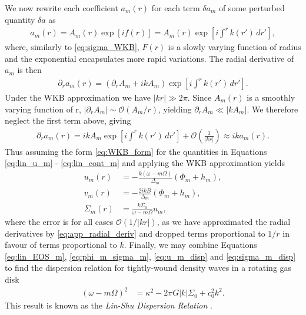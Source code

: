 We now rewrite each coefficient $a_m(r)$ for each term $\delta a_m$ of some perturbed quantity $\delta a$ as
\begin{align}
    a_m(r) = A_m(r) \exp \left[ i f(r) \right] = A_m(r) \exp \left[ i \int^r k(r') \, dr' \right], \label{eq:WKB_form}
\end{align}
where, similarly to \eqref{eq:sigma_WKB}, $F(r)$ is a slowly varying function of radius and the exponential encapsulates more rapid variations. 
The radial derivative of $a_m$ is then
\begin{align}
    \partial_r a_m(r) = \left( \partial_r A_m + ikA_m  \right) \exp \left[ i \int^r k(r') \, dr' \right].
\end{align}
Under the WKB approximation we have $|kr|\gg 2 \pi$.
Since $A_m(r)$ is a smoothly varying function of r, $|\partial_r A_m| \sim \mathcal{O}(A_m / r)$, yielding $\partial_r A_m \ll |k A_m|$.
We therefore neglect the first term above, giving
\begin{align}
    \partial_r a_m(r) = ikA_m \exp \left[ i \int^r k(r') \, dr' \right] + \mathcal{O}\left(\frac{1}{|kr|}\right) \approx ik a_m(r). \label{eq:app_radial_deriv}
\end{align}
Thus assuming the form \eqref{eq:WKB_form} for the quantities in Equations \eqref{eq:lin_u_m} - \eqref{eq:lin_cont_m} and applying the WKB approximation yields
\begin{align}
    u_m(r) &= - \frac{k(\omega-m\Omega)}{\Delta_m} (\Phi_m + h_m), \label{eq:u_m_disp} \\
    v_m(r) &= - \frac{2ikB}{\Delta_m} (\Phi_m + h_m), \label{eq:v_m_disp} \\
    \Sigma_m(r) &= \frac{k \Sigma_0}{\omega-m\Omega} u_m, \label{eq:sigma_m_disp}
\end{align}
where the error is for all cases $\mathcal{O}(1/|kr|)$, as we have approximated the radial derivatives by \eqref{eq:app_radial_deriv} and dropped terms proportional to $1/r$ in favour of terms proportional to $k$.
Finally, we may combine Equations \eqref{eq:lin_EOS_m}, \eqref{eq:phi_m_sigma_m}, \eqref{eq:u_m_disp} and \eqref{eq:sigma_m_disp} to find the dispersion relation for tightly-wound density waves in a rotating gas disk
\begin{align}
    \left( \omega - m \Omega  \right)^2 &= \kappa^2 - 2 \pi G |k| \Sigma_0 + c_0^2 k^2. \label{eq:lin_shu_disp}
\end{align}
This result is known as the \textit{Lin-Shu Dispersion Relation} \citep{lin1964}.

